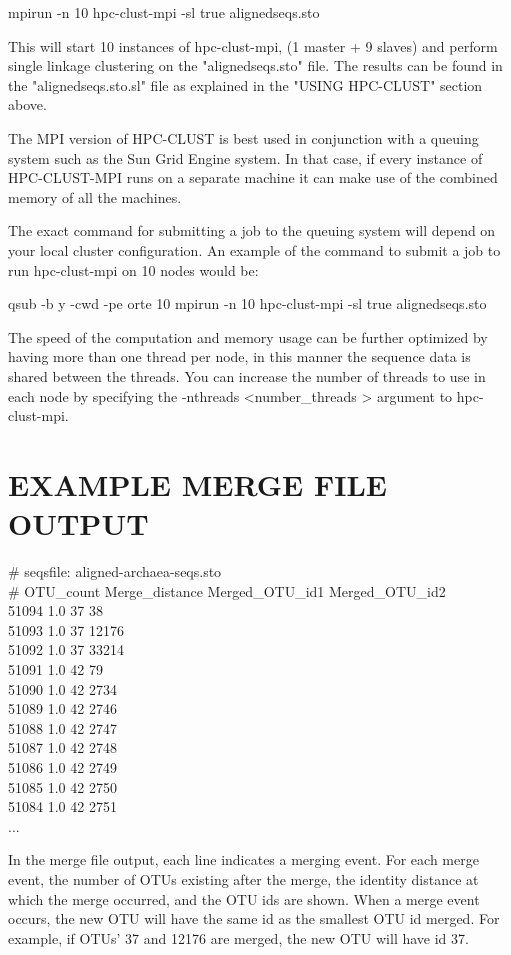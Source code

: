 \documentclass[10pt,a4paper]{article}
\begin{document}
mpirun -n 10 hpc-clust-mpi -sl true alignedseqs.sto

This will start 10 instances of hpc-clust-mpi, (1 master + 9 slaves) and perform single linkage
clustering on the "alignedseqs.sto" file. The results can be found in the "alignedseqs.sto.sl"
file as explained in the "USING HPC-CLUST" section above.

The MPI version of HPC-CLUST is best used in conjunction with a queuing system such as the
Sun Grid Engine system. In that case, if every instance of HPC-CLUST-MPI runs on a
separate machine it can make use of the combined memory of all the machines.

The exact command for submitting a job to the queuing system will depend on your local cluster
configuration. An example of the command to submit a job to run hpc-clust-mpi on 10 nodes would be:

qsub -b y -cwd -pe orte 10 mpirun -n 10 hpc-clust-mpi -sl true alignedseqs.sto


The speed of the computation and memory usage can be further optimized by having more than one
thread per node, in this manner the sequence data is shared between the threads. You can
increase the number of threads to use in each node by specifying the -nthreads \textless number\_threads \textgreater 
argument to hpc-clust-mpi.

\section{EXAMPLE MERGE FILE OUTPUT}

\# seqsfile: aligned-archaea-seqs.sto\\
\# OTU\_count Merge\_distance Merged\_OTU\_id1 Merged\_OTU\_id2\\
51094 1.0 37 38\\
51093 1.0 37 12176\\
51092 1.0 37 33214\\
51091 1.0 42 79\\
51090 1.0 42 2734\\
51089 1.0 42 2746\\
51088 1.0 42 2747\\
51087 1.0 42 2748\\
51086 1.0 42 2749\\
51085 1.0 42 2750\\
51084 1.0 42 2751\\
...

In the merge file output, each line indicates a merging event. For each merge event, the
number of OTUs existing after the merge, the identity distance at which the merge occurred,
and the OTU ids are shown. When a merge event occurs, the new OTU will have the same id 
as the smallest OTU id merged. For example, if OTUs' 37 and 12176 are merged, the new OTU
will have id 37.
\end{document}
